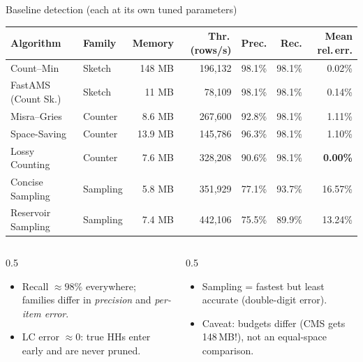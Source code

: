 \documentclass[11pt,aspectratio=169]{beamer}
\begin{document}
\begin{frame}{Baseline detection (each at its own tuned parameters)}
  \centering
  \scriptsize
  \renewcommand{\arraystretch}{1.15}
  \begin{tabular}{llrrrrr}
    \toprule
    \textbf{Algorithm} & \textbf{Family} & \textbf{Memory} & \textbf{Thr.\,(rows/s)} & \textbf{Prec.} & \textbf{Rec.} & \textbf{Mean rel.\,err.} \\
    \midrule
    Count--Min          & Sketch   & 148 MB & 196{,}132 & 98.1\% & 98.1\% & 0.02\% \\
    FastAMS (Count Sk.) & Sketch   & 11 MB  & 78{,}109  & 98.1\% & 98.1\% & 0.14\% \\
    Misra--Gries        & Counter  & 8.6 MB & 267{,}600 & 92.8\% & 98.1\% & 1.11\% \\
    Space-Saving        & Counter  & 13.9 MB& 145{,}786 & 96.3\% & 98.1\% & 1.10\% \\
    Lossy Counting      & Counter  & 7.6 MB & 328{,}208 & 90.6\% & 98.1\% & \textbf{0.00\%} \\
    Concise Sampling    & Sampling & 5.8 MB & 351{,}929 & 77.1\% & 93.7\% & 16.57\% \\
    Reservoir Sampling  & Sampling & 7.4 MB & 442{,}106 & 75.5\% & 89.9\% & 13.24\% \\
    \bottomrule
  \end{tabular}

  \vspace{0.6em}
  \begin{columns}[T]
    \begin{column}{0.5\textwidth}
      \footnotesize
      \begin{itemize}
        \item Recall $\approx 98\%$ everywhere; families differ in \emph{precision} and \emph{per-item error}.
        \item LC error $\approx 0$: true HHs enter early and are never pruned.
      \end{itemize}
    \end{column}
    \begin{column}{0.5\textwidth}
      \footnotesize
      \begin{itemize}
        \item Sampling = fastest but \alert{least accurate} (double-digit error).
        \item \alert{Caveat:} budgets differ (CMS gets 148\,MB!), not an equal-space comparison.
      \end{itemize}
    \end{column}
  \end{columns}
\end{frame}
\end{document}
